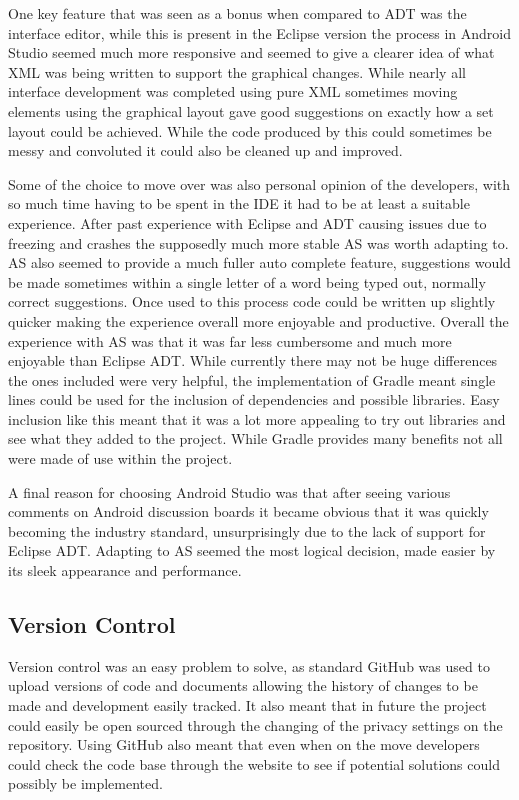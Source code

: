 One key feature that was seen as a bonus when compared to ADT was the interface editor, while this is present in the Eclipse version the process in Android Studio seemed much more responsive and seemed to give a clearer idea of what XML was being written to support the graphical changes. While nearly all interface development was completed using pure XML sometimes moving elements using the graphical layout gave good suggestions on exactly how a set layout could be achieved. While the code produced by this could sometimes be messy and convoluted it could also be cleaned up and improved. 

Some of the choice to move over was also personal opinion of the developers, with so much time having to be spent in the IDE it had to be at least a suitable experience. After past experience with Eclipse and ADT causing issues due to freezing and crashes the supposedly much more stable AS was worth adapting to. AS also seemed to provide a much fuller auto complete feature, suggestions would be made sometimes within a single letter of a word being typed out, normally correct suggestions. Once used to this process code could be written up slightly quicker making the experience overall more enjoyable and productive. Overall the experience with AS was that it was far less cumbersome and much more enjoyable than  Eclipse ADT. While currently there may not be huge differences the ones included were very helpful, the implementation of Gradle\cite{gradle} meant single lines could be used for the inclusion of dependencies and possible libraries. Easy inclusion like this meant that it was a lot more appealing to try out libraries and see what they added to the project. While Gradle provides many benefits not all were made of use within the project. 

A final reason for choosing Android Studio was that after seeing various comments on Android discussion boards it became obvious that it was quickly becoming the industry standard, unsurprisingly due to the lack of support for Eclipse ADT. Adapting to AS seemed the most logical decision, made easier by its sleek appearance and performance. 
\subsection{Version Control}
Version control was an easy problem to solve, as standard GitHub was used to upload versions of code and documents allowing the history of changes to be made and development easily tracked. It also meant that in future the project could easily be open sourced through the changing of the privacy settings on the repository. Using GitHub also meant that even when on the move developers could check the code base through the website to see if potential solutions could possibly be implemented. 


